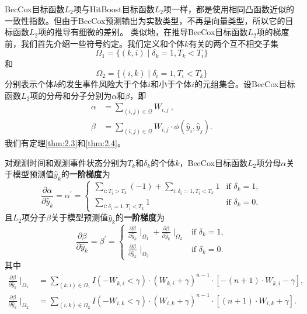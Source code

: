 BecCox目标函数$L_2$项与HitBoost目标函数$L_2$项一样，都是使用相同凸函数近似的一致性指数。但由于BecCox预测输出为实数类型，不再是向量类型，所以它的目标函数$L_2$项的推导有细微的差别。
类似地，在推导BecCox目标函数$L_2$项的梯度前，我们首先介绍一些符号约定。我们定义和个体$k$有关的两个互不相交子集
\begin{equation}
\Omega_1=\{(k,i) \mid \delta_k=1,T_k < T_i\}
\end{equation}
和
\begin{equation}
\Omega_2=\{(i,k) \mid \delta_i=1,T_i < T_k\}
\end{equation}
分别表示个体$k$的发生事件风险大于个体$i$和小于个体$i$的元组集合。设BecCox目标函数$L_2$项的分母和分子分别为$\alpha$和$\beta$，即
\begin{equation}
\begin{split}
\alpha &= \sum_{(i,j)\in \Omega} W_{i,j}\ ,\\
\beta &= \sum_{(i,j)\in \Omega} W_{i,j} \cdot \phi\left(\hat{y}_i, \hat{y}_j \right).
\end{split}
\end{equation}
我们有定理\ref{thm:2.3}和\ref{thm:2.4}。

\begin{theorem}\label{thm:2.3}
对观测时间和观测事件状态分别为$T_k$和$\delta_k$的个体$k$，BecCox目标函数$L_2$项分母$\alpha$关于模型预测值$\hat{y}_k$的\textbf{一阶梯度}为$$
\frac{\partial \alpha}{\partial \hat{y}_k}=\alpha^{'}=
\begin{cases}
\sum\limits_{i: T_i>T_k}(-1) + \sum\limits_{i: \delta_i=1,T_i<T_k} 1 & \text{if } \delta_k = 1,\\
\sum\limits_{i: \delta_i=1,T_i<T_k} 1 & \text{if } \delta_k = 0.
\end{cases}
$$ 且$L_2$项分子$\beta$关于模型预测值$\hat{y}_k$的\textbf{一阶梯度}为$$
\frac{\partial \beta}{\partial \hat{y}_k}=\beta^{'}=
\begin{cases}
\frac{\partial \beta}{\partial \hat{y}_k} \mid_{\Omega_1} + \frac{\partial \beta}{\partial \hat{y}_k} \mid_{\Omega_2} & \text{if } \delta_k = 1,\\
\frac{\partial \beta}{\partial \hat{y}_k} \mid_{\Omega_2} & \text{if } \delta_k = 0.
\end{cases}
$$ 其中\[
\begin{split}
\frac{\partial \beta}{\partial \hat{y}_k} \mid_{\Omega_1} &= \sum\limits_{(k,i)\in \Omega_1} {I(-W_{k,i}<\gamma)\cdot (W_{k,i}+\gamma)^{n-1}\cdot [-(n+1)\cdot W_{k,i}-\gamma]}, \\
\frac{\partial \beta}{\partial \hat{y}_k} \mid_{\Omega_2} &= \sum\limits_{(i,k)\in \Omega_2} {I(-W_{i,k}<\gamma)\cdot (W_{i,k}+\gamma)^{n-1}\cdot [(n+1)\cdot W_{i,k}+\gamma]}.
\end{split}
\]
\end{theorem}

